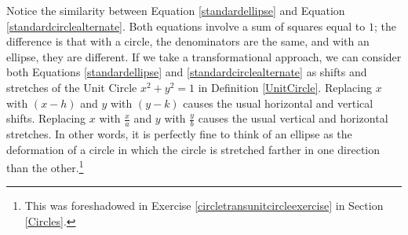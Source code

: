 \medskip
  
Notice the similarity between Equation \ref{standardellipse} and Equation \ref{standardcirclealternate}.  Both equations involve a sum of squares equal to $1$;  the difference is that with a circle, the denominators are the same, and with an ellipse, they are different.  If we take a transformational approach, we can consider both Equations \ref{standardellipse} and \ref{standardcirclealternate} as shifts and stretches of the Unit Circle $x^2 + y^2 = 1$ in Definition \ref{UnitCircle}.  Replacing $x$ with $(x-h)$ and $y$ with $(y-k)$ causes the usual horizontal and vertical shifts.  Replacing $x$ with $\frac{x}{a}$ and $y$ with $\frac{y}{b}$ causes the usual vertical and horizontal stretches.  In other words, it is perfectly fine to think of an ellipse as the deformation of a circle in which the circle is stretched farther in one direction than the other.\footnote{This was foreshadowed in Exercise \ref{circletransunitcircleexercise} in Section \ref{Circles}.}

\medskip


